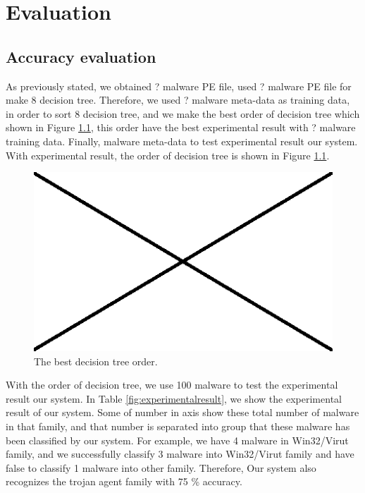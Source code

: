 \chapter{Evaluation}\label{chap:6}


\section{Accuracy evaluation}
As previously stated, we obtained ? malware PE file, used ? malware PE file for make $8$ decision tree. Therefore, we used ? malware meta-data as training data, in order to sort $8$ decision tree, and we make the best order of decision tree which shown in Figure \ref{fig:ordertree}, this order have the best experimental result with ? malware training data. 
Finally, malware meta-data to test experimental result our system.
With experimental result, the order of decision tree is shown in Figure \ref{fig:ordertree}.
\begin{figure}[httb]
  \centering
    \includegraphics[width=1\textwidth]{graph/ordertree.jpg}
     \caption{The best decision tree order.}
     \label{fig:ordertree}
\end{figure}

With the order of decision tree, we use 100 malware to test the experimental result our system. In Table \ref{fig:experimentalresult}, we show the experimental result of our system. Some of number in axis show these total number of malware in that family, and that number is separated into group that these malware has been classified by our system. For example, we have 4 malware in Win32/Virut family, and we successfully classify 3 malware into Win32/Virut  family and have false to classify 1 malware into other family. Therefore, Our system also recognizes the trojan agent family with 75 \% accuracy.\\
\\

